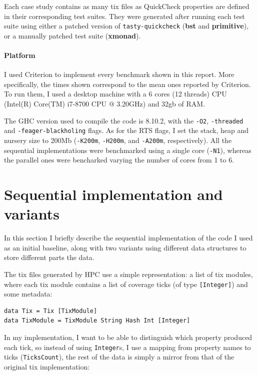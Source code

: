 \documentclass[a4paper,10pt]{article}
\begin{document}
Each case study contains as many tix files as QuickCheck properties are defined
in their corresponding test suites.
%
They were generated after running each test suite using either a patched version
of \texttt{tasty-quickcheck} \cite{tasty-quickcheck-hpc} (\textbf{bst} and
\textbf{primitive}), or a manually patched test suite (\textbf{xmonad}).

\paragraph{Platform}
I used Criterion to implement every benchmark shown in this report.
%
More specifically, the times shown correspond to the mean ones reported by
Criterion.
%
To run them, I used a desktop machine with a 6 cores (12 threads) CPU (Intel(R)
Core(TM) i7-8700 CPU @ 3.20GHz) and 32gb of RAM.


The GHC version used to compile the code is 8.10.2, with the \texttt{-O2},
\texttt{-threaded} and \texttt{-feager-blackholing} flags.
%
As for the RTS flags, I set the stack, heap and nursery size to 200Mb
(\texttt{-K200m}, \texttt{-H200m}, and \texttt{-A200m}, respectively).
%
All the sequential implementations were benchmarked using a single core
(\texttt{-N1}), whereas the parallel ones were bencharked varying the number of
cores from 1 to 6.

\section*{Sequential implementation and variants}

In this section I briefly describe the sequential implementation of the code I
used as an initial baseline, along with two variants using different data
structures to store different parts the data.

The tix files generated by HPC use a simple representation: a list of tix
modules, where each tix module contains a list of coverage ticks (of type
\texttt{[Integer]}) and some metadata:

\begin{verbatim}
data Tix = Tix [TixModule]
data TixModule = TixModule String Hash Int [Integer]
\end{verbatim}

In my implementation, I want to be able to distinguish which property produced
each tick, so instead of using \texttt{Integer}s, I use a mapping from property
names to ticks (\texttt{TicksCount}), the rest of the data is simply a mirror
from that of the original tix implementation:
\end{document}
